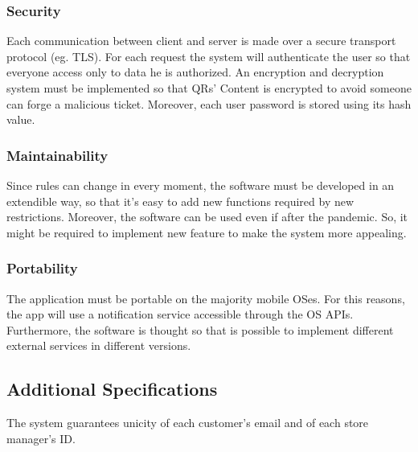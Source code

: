 \documentclass{article}
\begin{document}
		\subsubsection{Security}
		Each communication between client and server is made over a secure transport protocol (eg. TLS). For each request the system will authenticate the user so that everyone access only to data he is authorized. An encryption and decryption system must be implemented so that QRs' Content is encrypted to avoid someone can forge a malicious ticket. Moreover, each user password is stored using its hash value. 
		\subsubsection{Maintainability}
		Since rules can change in every moment, the software must be developed in an extendible way, so that it's easy to add new functions required by new restrictions. Moreover, the software can be used even if after the pandemic. So, it might be required to implement new feature to make the system more appealing.
		\subsubsection{Portability}
		The application must be portable on the majority mobile OSes. For this reasons, the app will use a notification service accessible through the OS APIs. Furthermore, the software is thought so that is possible to implement different external services in different versions.
		\subsection{Additional Specifications}
	The system guarantees unicity of each customer's email and of each store manager's ID.
	
	\newpage
	
\end{document}
